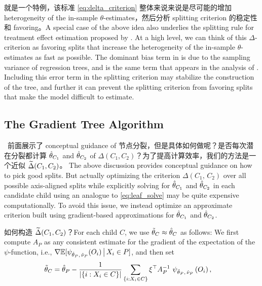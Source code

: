 \documentclass[aos]{imsart}
\theoremstyle{plain}
\theoremstyle{definition}
\theoremstyle{remark}
\begin{document}
\begin{CJK}{UTF8}{gbsn}
\citet{athey2016recursive} 就是一个特例，该标准 \eqref{eq:delta_criterion} 整体来说来说是尽可能的增加 heterogeneity of the in-sample $\theta$-estimates，然后分析 splitting criterion 的稳定性和 favoring。A special case of the above idea also underlies
the splitting rule for treatment effect estimation proposed by \citet{athey2016recursive}.
At a high level, we can think of this $\Delta$-criterion as favoring splits that
increase the heterogeneity of the in-sample $\theta$-estimates as fast as possible.
The dominant bias term in  is due to the
sampling variance of regression trees, and is the same term that appears in the analysis
of \citet{athey2016recursive}. Including this error term in the splitting criterion may
stabilize the construction of the tree, and further it can prevent the splitting criterion
from favoring splits that make the model difficult to estimate.

\subsection{The Gradient Tree Algorithm} 

\, 前面展示了 conceptual guidance of 节点分裂，但是具体如何做呢？是否每次潜在分裂都计算 $\hat{\theta}_{C_1}$ and $\hat{\theta}_{C_2}$  of $\Delta(C_1, C_2)$？为了提高计算效率，我们的方法是一个近似   $\widetilde{\Delta}(C_1, C_2)$。
The above discussion provides conceptual guidance on how to pick good splits. But actually optimizing the
criterion $\Delta(C_1, \, C_2)$ over all possible axis-aligned splits
while explicitly solving for $\hat{\theta}_{C_1}$ and $\hat{\theta}_{C_2}$ in each candidate child
using an analogue to \eqref{eq:leaf_solve} may be quite expensive computationally.
To avoid this issue, we instead optimize an approximate criterion 
built using gradient-based approximations for $\hat{\theta}_{C_1}$ and $\hat{\theta}_{C_2}$.




如何构造 $\widetilde{\Delta}(C_1, C_2)$？For each child $C$, we use $\tilde{\theta}_C \approx \hat{\theta}_C$ as follows:
We first compute $A_P$ as any consistent estimate for the gradient of the expectation of the $\psi$-function, i.e.,
$\nabla \mathbb{E}[\psi_{\hat{\theta}_P, \, \hat{\nu}_P}(O_i) \,\big|\, X_i \in P]$, and then set
\begin{align}
\label{eq:ttheta}
&\ttheta_C = \htheta_P - \frac{1}{\abs{\cb{i : X_i \in C}}} \sum_{\cb{i : X_i \in C}} \xi^\top A^{-1}_P \ \psi_{\htheta_P, \, \hnu_P}\p{O_i},
\end{align}


\end{CJK}
\end{document}
